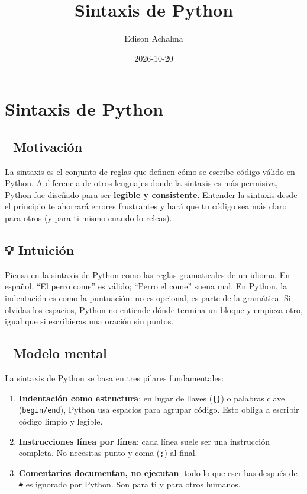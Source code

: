 \documentclass[
  doc,
  floatsintext,
  longtable,
  a4paper,
  nolmodern,
  notxfonts,
  notimes,
  12pt,
  colorlinks=true,linkcolor=blue,citecolor=blue,urlcolor=blue]{apa7}
\title{Sintaxis de Python}
\author{Edison Achalma}
\affiliation{
{Escuela Profesional de Economía, Universidad Nacional de San Cristóbal
de Huamanga}}
\date{2026-10-20}
\begin{document}
\maketitle


\hypertarget{toc}{}
\tableofcontents
\newpage
\section[Introduction]{Sintaxis de Python}

\setcounter{secnumdepth}{3}

\setlength\LTleft{0pt}




\subsection{🎯 Motivación}\label{motivaciuxf3n}

La sintaxis es el conjunto de reglas que definen cómo se escribe código
válido en Python. A diferencia de otros lenguajes donde la sintaxis es
más permisiva, Python fue diseñado para ser \textbf{legible y
consistente}. Entender la sintaxis desde el principio te ahorrará
errores frustrantes y hará que tu código sea más claro para otros (y
para ti mismo cuando lo releas).

\subsection{💡 Intuición}\label{intuiciuxf3n}

Piensa en la sintaxis de Python como las reglas gramaticales de un
idioma. En español, ``El perro come'' es válido; ``Perro el come'' suena
mal. En Python, la indentación es como la puntuación: no es opcional, es
parte de la gramática. Si olvidas los espacios, Python no entiende dónde
termina un bloque y empieza otro, igual que si escribieras una oración
sin puntos.

\subsection{🧠 Modelo mental}\label{modelo-mental}

La sintaxis de Python se basa en tres pilares fundamentales:

\begin{enumerate}
\def\labelenumi{\arabic{enumi}.}
\item
  \textbf{Indentación como estructura}: en lugar de llaves
  (\texttt{\{\}}) o palabras clave (\texttt{begin/end}), Python usa
  espacios para agrupar código. Esto obliga a escribir código limpio y
  legible.
\item
  \textbf{Instrucciones línea por línea}: cada línea suele ser una
  instrucción completa. No necesitas punto y coma (\texttt{;}) al final.
\item
  \textbf{Comentarios documentan, no ejecutan}: todo lo que escribas
  después de \texttt{\#} es ignorado por Python. Son para ti y para
  otros humanos.
\end{enumerate}
\end{document}
